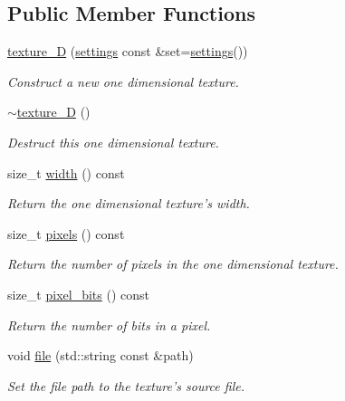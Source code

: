 \subsection*{Public Member Functions}
\begin{DoxyCompactItemize}
\item 
\hyperlink{classgfx_1_1texture__1D_aca51a5be04edd8173aa93b477b0095ea}{texture\-\_\-D} (\hyperlink{classgfx_1_1texture__1D_1_1settings}{settings} const \&set=\hyperlink{classgfx_1_1texture__1D_1_1settings}{settings}())
\begin{DoxyCompactList}\small\item\em Construct a new one dimensional texture. \end{DoxyCompactList}\item 
\hyperlink{classgfx_1_1texture__1D_a20e9b9e4ff10e2ce94c457dd3de14984}{$\sim$texture\-\_\-D} ()
\begin{DoxyCompactList}\small\item\em Destruct this one dimensional texture. \end{DoxyCompactList}\item 
size\-\_\-t \hyperlink{classgfx_1_1texture__1D_acc970cb5929f9292a389dd2c2c52d66e}{width} () const 
\begin{DoxyCompactList}\small\item\em Return the one dimensional texture's width. \end{DoxyCompactList}\item 
size\-\_\-t \hyperlink{classgfx_1_1texture__1D_a74147fa5a5b6a8a849936fe34bacf9d0}{pixels} () const 
\begin{DoxyCompactList}\small\item\em Return the number of pixels in the one dimensional texture. \end{DoxyCompactList}\item 
size\-\_\-t \hyperlink{classgfx_1_1texture__1D_a18a1e13d19de574ded9766e696ac5422}{pixel\-\_\-bits} () const 
\begin{DoxyCompactList}\small\item\em Return the number of bits in a pixel. \end{DoxyCompactList}\item 
void \hyperlink{classgfx_1_1texture__1D_a58beed36f3575d3eaabccac318b3c61a}{file} (std\-::string const \&path)
\begin{DoxyCompactList}\small\item\em Set the file path to the texture's source file. \end{DoxyCompactList}\item 

\end{DoxyCompactItemize}
